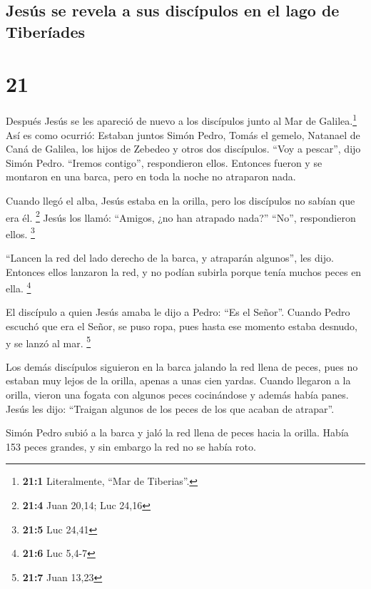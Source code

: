 \hypertarget{jesuxfas-se-revela-a-sus-discuxedpulos-en-el-lago-de-tiberuxedades}{%
\subsection{Jesús se revela a sus discípulos en el lago de
Tiberíades}\label{jesuxfas-se-revela-a-sus-discuxedpulos-en-el-lago-de-tiberuxedades}}

\hypertarget{section-20}{%
\section{21}\label{section-20}}

 Después Jesús se les apareció de nuevo a los discípulos
junto al Mar de Galilea.\footnote{\textbf{21:1} Literalmente, ``Mar de
  Tiberias''.} Así es como ocurrió:  Estaban juntos Simón
Pedro, Tomás el gemelo, Natanael de Caná de Galilea, los hijos de
Zebedeo y otros dos discípulos.  ``Voy a pescar'', dijo
Simón Pedro. ``Iremos contigo'', respondieron ellos. Entonces fueron y
se montaron en una barca, pero en toda la noche no atraparon nada.

 Cuando llegó el alba, Jesús estaba en la orilla, pero los
discípulos no sabían que era él. \footnote{\textbf{21:4} Juan 20,14; Luc
  24,16}  Jesús los llamó: ``Amigos, ¿no han atrapado
nada?'' ``No'', respondieron ellos. \footnote{\textbf{21:5} Luc 24,41}

 ``Lancen la red del lado derecho de la barca, y atraparán
algunos'', les dijo. Entonces ellos lanzaron la red, y no podían subirla
porque tenía muchos peces en ella. \footnote{\textbf{21:6} Luc 5,4-7}

 El discípulo a quien Jesús amaba le dijo a Pedro: ``Es el
Señor''. Cuando Pedro escuchó que era el Señor, se puso ropa, pues hasta
ese momento estaba desnudo, y se lanzó al mar. \footnote{\textbf{21:7}
  Juan 13,23}

 Los demás discípulos siguieron en la barca jalando la red
llena de peces, pues no estaban muy lejos de la orilla, apenas a unas
cien yardas.  Cuando llegaron a la orilla, vieron una
fogata con algunos peces cocinándose y además había panes.
 Jesús les dijo: ``Traigan algunos de los peces de los
que acaban de atrapar''.

 Simón Pedro subió a la barca y jaló la red llena de
peces hacia la orilla. Había 153 peces grandes, y sin embargo la red no
se había roto.

